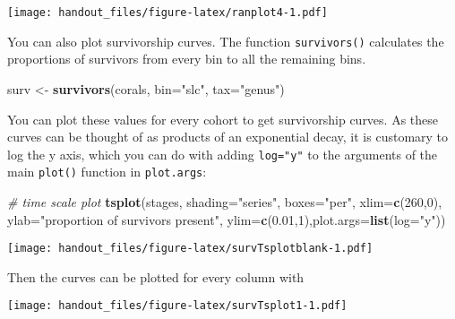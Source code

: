\documentclass[]{article}
\newenvironment{Shaded}{\begin{snugshade}}{\end{snugshade}}
\newcommand{\KeywordTok}[1]{\textcolor[rgb]{0.13,0.29,0.53}{\textbf{{#1}}}}
\newcommand{\DataTypeTok}[1]{\textcolor[rgb]{0.13,0.29,0.53}{{#1}}}
\newcommand{\DecValTok}[1]{\textcolor[rgb]{0.00,0.00,0.81}{{#1}}}
\newcommand{\FloatTok}[1]{\textcolor[rgb]{0.00,0.00,0.81}{{#1}}}
\newcommand{\StringTok}[1]{\textcolor[rgb]{0.31,0.60,0.02}{{#1}}}
\newcommand{\CommentTok}[1]{\textcolor[rgb]{0.56,0.35,0.01}{\textit{{#1}}}}
\newcommand{\NormalTok}[1]{{#1}}
\begin{document}
\texttt{[image: handout\_files/figure-latex/ranplot4-1.pdf]}

You can also plot survivorship curves. The function \texttt{survivors()}
calculates the proportions of survivors from every bin to all the
remaining bins.

\begin{Shaded}
\begin{Highlighting}[]
\NormalTok{surv <-}\StringTok{ }\KeywordTok{survivors}\NormalTok{(corals, }\DataTypeTok{bin=}\StringTok{"slc"}\NormalTok{, }\DataTypeTok{tax=}\StringTok{"genus"}\NormalTok{)}
\end{Highlighting}
\end{Shaded}

You can plot these values for every cohort to get survivorship curves.
As these curves can be thought of as products of an exponential decay,
it is customary to log the y axis, which you can do with adding
\texttt{log="y"} to the arguments of the main \texttt{plot()} function
in \texttt{plot.args}:

\begin{Shaded}
\begin{Highlighting}[]
\CommentTok{# time scale plot}
\KeywordTok{tsplot}\NormalTok{(stages, }\DataTypeTok{shading=}\StringTok{"series"}\NormalTok{, }\DataTypeTok{boxes=}\StringTok{"per"}\NormalTok{, }
  \DataTypeTok{xlim=}\KeywordTok{c}\NormalTok{(}\DecValTok{260}\NormalTok{,}\DecValTok{0}\NormalTok{), }\DataTypeTok{ylab=}\StringTok{"proportion of survivors present"}\NormalTok{,}
  \DataTypeTok{ylim=}\KeywordTok{c}\NormalTok{(}\FloatTok{0.01}\NormalTok{,}\DecValTok{1}\NormalTok{),}\DataTypeTok{plot.args=}\KeywordTok{list}\NormalTok{(}\DataTypeTok{log=}\StringTok{"y"}\NormalTok{))}
\end{Highlighting}
\end{Shaded}

\texttt{[image: handout\_files/figure-latex/survTsplotblank-1.pdf]}

Then the curves can be plotted for every column with

\begin{Shaded}
\end{Shaded}

\texttt{[image: handout\_files/figure-latex/survTsplot1-1.pdf]}
\end{document}
